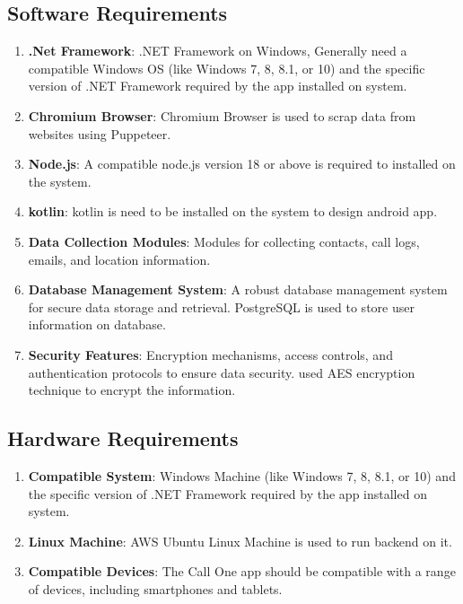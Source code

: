 \subsection{Software Requirements}

\begin{enumerate}[label=\roman*.]
    \item \textbf{.Net Framework}:  .NET Framework on Windows, Generally need a compatible Windows OS (like Windows 7, 8, 8.1, or 10) and the specific version of .NET Framework required by the app installed on system.
    \item \textbf{Chromium Browser}:  Chromium Browser is used to scrap data from websites using Puppeteer.
    \item \textbf{Node.js}: A compatible node.js version 18 or above is required to installed on the system.
    \item \textbf{kotlin}: kotlin is need to be installed on the system to design android app. 
    \item \textbf{Data Collection Modules}: Modules for collecting contacts, call logs, emails, and location information.
    \item \textbf{Database Management System}: A robust database management system for secure data storage and retrieval. PostgreSQL is used to store user information on database.
    \item \textbf{Security Features}: Encryption mechanisms, access controls, and authentication protocols to ensure data security. used AES encryption technique to encrypt the information.
\end{enumerate}

\subsection{Hardware Requirements}

\begin{enumerate}[label=\roman*.]
    \item \textbf{Compatible System}: Windows Machine (like Windows 7, 8, 8.1, or 10) and the specific version of .NET Framework required by the app installed on system. 
    \item \textbf{Linux Machine}: AWS Ubuntu Linux Machine is used to run backend on it.
    \item \textbf{Compatible Devices}: The Call One app should be compatible with a range of devices, including smartphones and tablets.
\end{enumerate}